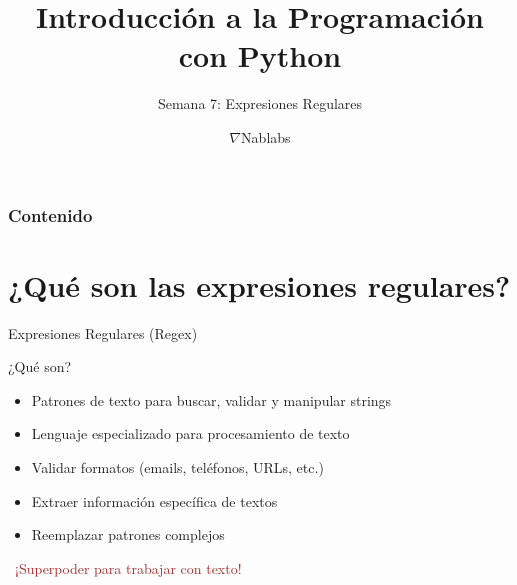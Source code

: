 \documentclass{beamer}
\title{\textbf{Introducción a la Programación con Python}}
\subtitle{Semana 7: Expresiones Regulares}
\author{$\nabla$Nablabs}
\date{}
\begin{document}
\begin{frame}
\titlepage
\end{frame}

\begin{frame}
\frametitle{Contenido}
\tableofcontents
\end{frame}

\section{¿Qué son las expresiones regulares?}

\begin{frame}{Expresiones Regulares (Regex) \faSearch}
\begin{conceptbox}{¿Qué son?}
\small
\begin{itemize}
    \item[\faCode] Patrones de texto para buscar, validar y manipular strings
    \item[\faMagic] Lenguaje especializado para procesamiento de texto
    \item[\faCheckCircle] Validar formatos (emails, teléfonos, URLs, etc.)
    \item[\faExchangeAlt] Extraer información específica de textos
    \item[\faEdit] Reemplazar patrones complejos
\end{itemize}
\end{conceptbox}

\vspace{0.2cm}
\begin{center}
\large\textcolor{brown}{\faLightbulb\ ¡Superpoder para trabajar con texto!}
\end{center}
\end{frame}
\end{document}
